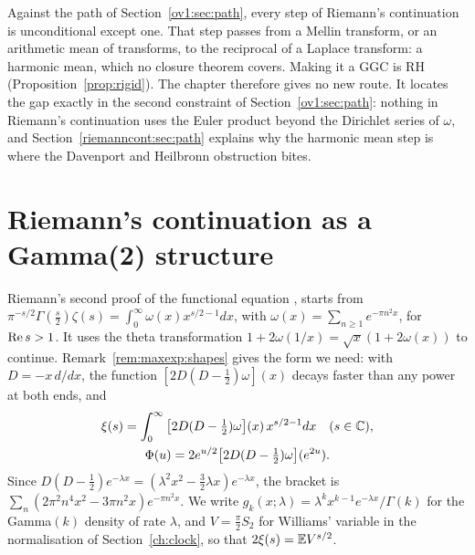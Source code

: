 Against the path of Section~\ref{ov1:sec:path}, every step of Riemann's continuation is unconditional except one. That step passes from a Mellin transform, or an arithmetic mean of transforms, to the reciprocal of a Laplace transform: a harmonic mean, which no closure theorem covers. Making it a GGC is RH (Proposition~\ref{prop:rigid}). The chapter therefore gives no new route. It locates the gap exactly in the second constraint of Section~\ref{ov1:sec:path}: nothing in Riemann's continuation uses the Euler product beyond the Dirichlet series of $\omega$, and Section~\ref{riemanncont:sec:path} explains why the harmonic mean step is where the Davenport and Heilbronn obstruction bites.

\section{Riemann's continuation as a Gamma(2) structure}\label{riemanncont:sec:riemann}

Riemann's second proof of the functional equation \cite{NCRiemann1859}, \cite[Section 1.7]{Edwards} starts from $\pi^{-s/2}\Gamma(\frac s2)\zeta(s)=\int_0^\infty\omega(x)x^{s/2-1}dx$, with $\omega(x)=\sum_{n\ge1}e^{-\pi n^2x}$, for $\operatorname{Re} s>1$. It uses the theta transformation $1+2\omega(1/x)=\sqrt x(1+2\omega(x))$ to continue. Remark~\ref{rem:maxexp:shapes} gives the form we need: with $D=-x\,d/dx$, the function $[2D(D-\frac12)\omega](x)$ decays faster than any power at both ends, and
\begin{equation}\label{riemanncont:eq:riemann}
\begin{gathered}\xi(s)=\int_0^\infty\big[2D(D-\tfrac12)\omega\big](x)\,x^{s/2-1}dx\quad(s\in\mathbb{C}),\\ \Phi(u)=2e^{u/2}\big[2D(D-\tfrac12)\omega\big](e^{2u}).\end{gathered}
\end{equation}
Since $D(D-\frac12)e^{-\lambda x}=(\lambda^2x^2-\frac32\lambda x)e^{-\lambda x}$, the bracket is $\sum_n(2\pi^2n^4x^2-3\pi n^2x)e^{-\pi n^2x}$. We write $g_k(x;\lambda)=\lambda^kx^{k-1}e^{-\lambda x}/\Gamma(k)$ for the Gamma$(k)$ density of rate $\lambda$, and $V=\frac\pi2S_2$ for Williams' variable in the normalisation of Section~\ref{ch:clock}, so that $2\xi(s)=\mathbb{E} V^{s/2}$.

